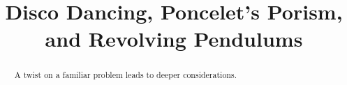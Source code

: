 \documentclass{ximera}
\title{Disco Dancing, Poncelet's Porism, and Revolving Pendulums}
\begin{document}
\begin{abstract}
A twist on a familiar problem leads to deeper considerations.
\end{abstract}
\maketitle
\end{document}
